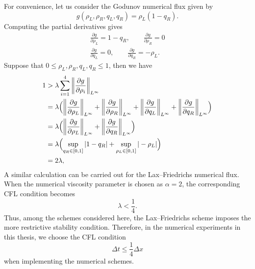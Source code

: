 For convenience, let us consider the Godunov numerical flux given by
\[
    g(\rho_L,\rho_R,q_L,q_R)= \rho_L (1-q_R).
\]
Computing the partial derivatives gives
\begin{equation}
    \begin{split}
        \frac{\partial g}{\partial \rho_L}  = 1-q_R, \qquad  \frac{\partial g}{\partial \rho_R}  = 0 \\
        \frac{\partial g}{\partial q_L}     = 0,  \qquad   \frac{\partial g}{\partial q_R}       = -\rho_L.
    \end{split}
\end{equation}
Suppose that $0 \leq \rho_L, \rho_R, q_L, q_R \leq 1$, then we have
\begin{equation}\label{eq:lambda_God}
    \begin{split}
        1 & > \lambda \sum_{i=1}^4 \left\lVert \frac{\partial g}{\partial \rho_i} \right\rVert_{L^{\infty}}                                                                                                                                                                                                                          \\
          & =\lambda \Bigl(\left\lVert \frac{\partial g}{\partial \rho_L} \right\rVert_{L^{\infty}} + \left\lVert \frac{\partial g}{\partial \rho_R} \right\rVert_{L^{\infty}} + \left\lVert \frac{\partial g}{\partial q_L} \right\rVert_{L^{\infty}} + \left\lVert \frac{\partial g}{\partial q_R} \right\rVert_{L^{\infty}}\Bigr) \\
          & = \lambda \Bigl(\left\lVert \frac{\partial g}{\partial \rho_L} \right\rVert_{L^{\infty}}+ \left\lVert \frac{\partial g}{\partial q_R} \right\rVert_{L^{\infty}}\Bigr)                                                                                                                                                    \\
          & = \lambda \Bigl( \sup\limits_{q_R \in [0,1]}| 1-q_R\vert  +  \sup\limits_{\rho_L \in [0,1]}|-\rho_L\vert \Bigr)                                                                                                                                                                                                          \\
          & =  2\lambda,
    \end{split}
\end{equation}
A similar calculation can be carried out for the Lax--Friedrichs numerical flux.
When the numerical viscosity parameter is chosen as $\alpha=2$, the corresponding
CFL condition becomes
\[
    \lambda < \frac{1}{4}.
\]
Thus, among the schemes considered here, the Lax--Friedrichs scheme imposes the
more restrictive stability condition. Therefore, in the numerical experiments in
this thesis, we choose the CFL condition
\begin{equation}\label{eq:stability}
    \Delta t \leq \frac{1}{4}\Delta x
\end{equation}
when implementing the numerical schemes.









